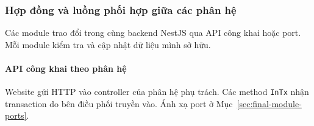 \newcommand{\NumberedHandoffMethod}[2]{%
  {\noindent\hangindent=1.45em\hangafter=1%
   \makebox[1.45em][l]{\footnotesize\textbf{#1.}}\Sig{#2}}%
}

\clearpage
\begingroup
\setlength{\LTpre}{4pt}
\setlength{\LTpost}{4pt}
\subsubsection{Hợp đồng và luồng phối hợp giữa các phân hệ}
\label{sec:final-module-handoffs}

Các module trao đổi trong cùng backend NestJS qua API công khai hoặc port. Mỗi module kiểm tra và cập nhật dữ liệu mình sở hữu.

\paragraph{API công khai theo phân hệ}
\label{sec:final-module-api}

Website gửi HTTP vào controller của phân hệ phụ trách. Các method \texttt{InTx} nhận transaction do bên điều phối truyền vào. Ánh xạ port ở Mục~\ref{sec:final-module-ports}.

